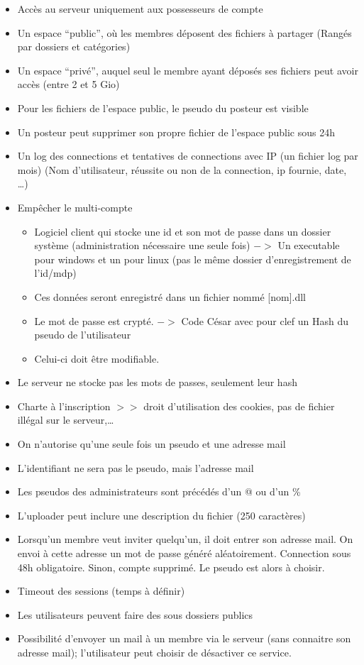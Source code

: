 \documentclass[12pt,a4paper,twoside]{article}
\begin{document}
    \begin{itemize}
        \item{} Accès au serveur uniquement aux possesseurs de compte
        \item{} Un espace ``public'', où les membres déposent des fichiers à partager (Rangés par dossiers et catégories)
        \item{} Un espace ``privé'', auquel seul le membre ayant déposés ses fichiers peut avoir accès (entre 2 et 5 Gio)
        \item{} Pour les fichiers de l'espace public, le pseudo du posteur est visible
        \item{} Un posteur peut supprimer son propre fichier de l'espace public sous 24h
        \item{} Un log des connections et tentatives de connections avec IP (un fichier log par mois) (Nom d'utilisateur, réussite ou non de la connection, ip fournie, date, \ldots{})
        \item{} Empêcher le multi-compte
        \begin{itemize}
            \item{} Logiciel client qui stocke une id et son mot de passe dans un dossier système (administration nécessaire une seule fois) $->$ Un executable pour windows et un pour linux (pas le même dossier d'enregistrement de l'id/mdp)
            \item{} Ces données seront enregistré dans un fichier nommé [nom].dll
            \item{} Le mot de passe est crypté. $->$ Code César avec pour clef un Hash du pseudo de l'utilisateur
            \item{} Celui-ci doit être modifiable.
        \end{itemize}
        \item{} Le serveur ne stocke pas les mots de passes, seulement leur hash
        \item{} Charte à l'inscription $>>$ droit d'utilisation des cookies, pas de fichier illégal sur le serveur,\ldots{}
        \item{} On n'autorise qu'une seule fois un pseudo et une adresse mail
        \item{} L'identifiant ne sera pas le pseudo, mais l'adresse mail
        \item{} Les pseudos des administrateurs sont précédés d'un @ ou d'un \%
        \item{} L'uploader peut inclure une description du fichier (250 caractères)
        \item{} Lorsqu'un membre veut inviter quelqu'un, il doit entrer son adresse mail. On envoi à cette adresse un mot de passe généré aléatoirement. Connection sous 48h obligatoire. Sinon, compte supprimé.
        Le pseudo est alors à choisir.
        \item{} Timeout des sessions (temps à définir)
        \item{} Les utilisateurs peuvent faire des sous dossiers publics
        \item{} Possibilité d'envoyer un mail à un membre via le serveur (sans connaitre son adresse mail); l'utilisateur peut choisir de désactiver ce service.
    \end{itemize}
\end{document}
